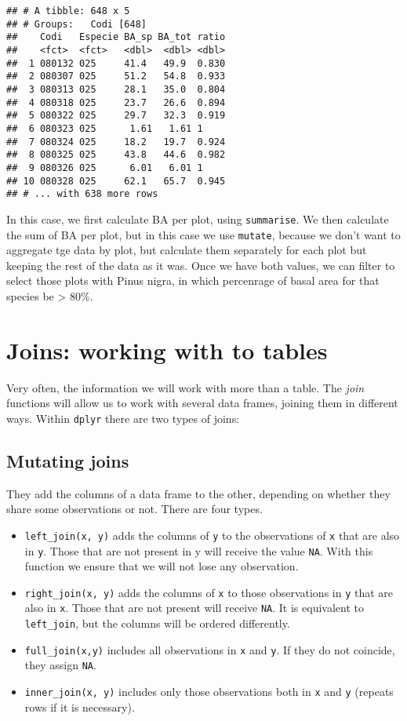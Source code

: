 \documentclass[]{article}
\begin{document}
\begin{verbatim}
## # A tibble: 648 x 5
## # Groups:   Codi [648]
##    Codi   Especie BA_sp BA_tot ratio
##    <fct>  <fct>   <dbl>  <dbl> <dbl>
##  1 080132 025     41.4   49.9  0.830
##  2 080307 025     51.2   54.8  0.933
##  3 080313 025     28.1   35.0  0.804
##  4 080318 025     23.7   26.6  0.894
##  5 080322 025     29.7   32.3  0.919
##  6 080323 025      1.61   1.61 1    
##  7 080324 025     18.2   19.7  0.924
##  8 080325 025     43.8   44.6  0.982
##  9 080326 025      6.01   6.01 1    
## 10 080328 025     62.1   65.7  0.945
## # ... with 638 more rows
\end{verbatim}

In this case, we first calculate BA per plot, using \texttt{summarise}.
We then calculate the sum of BA per plot, but in this case we use
\texttt{mutate}, because we don't want to aggregate tge data by plot,
but calculate them separately for each plot but keeping the rest of the
data as it was. Once we have both values, we can filter to select those
plots with Pinus nigra, in which percenrage of basal area for that
species be \textgreater{} 80\%. \newpage

\newpage

\section{Joins: working with to
tables}\label{joins-working-with-to-tables}

Very often, the information we will work with more than a table. The
\emph{join} functions will allow us to work with several data frames,
joining them in different ways. Within \texttt{dplyr} there are two
types of joins:

\subsection{Mutating joins}\label{mutating-joins}

They add the columns of a data frame to the other, depending on whether
they share some observations or not. There are four types.

\begin{itemize}
\item
  \texttt{left\_join(x,\ y)} adds the columns of \texttt{y} to the
  observations of \texttt{x} that are also in \texttt{y}. Those that are
  not present in y will receive the value \texttt{NA}. With this
  function we ensure that we will not lose any observation.
\item
  \texttt{right\_join(x,\ y)} adds the columns of \texttt{x} to those
  observations in \texttt{y} that are also in \texttt{x}. Those that are
  not present will receive \texttt{NA}. It is equivalent to
  \texttt{left\_join}, but the columns will be ordered differently.
\item
  \texttt{full\_join(x,y)} includes all observations in \texttt{x} and
  \texttt{y}. If they do not coincide, they assign \texttt{NA}.
\item
  \texttt{inner\_join(x,\ y)} includes only those observations both in
  \texttt{x} and \texttt{y} (repeats rows if it is necessary).
\end{itemize}
\end{document}
